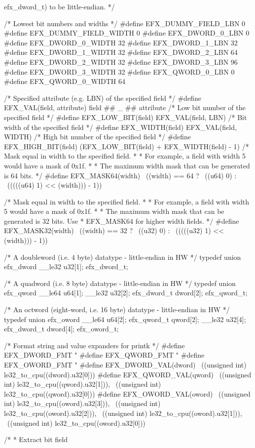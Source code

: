  efx_dword_t) to be little-endian.
 */

/* Lowest bit numbers and widths */
#define EFX_DUMMY_FIELD_LBN 0
#define EFX_DUMMY_FIELD_WIDTH 0
#define EFX_DWORD_0_LBN 0
#define EFX_DWORD_0_WIDTH 32
#define EFX_DWORD_1_LBN 32
#define EFX_DWORD_1_WIDTH 32
#define EFX_DWORD_2_LBN 64
#define EFX_DWORD_2_WIDTH 32
#define EFX_DWORD_3_LBN 96
#define EFX_DWORD_3_WIDTH 32
#define EFX_QWORD_0_LBN 0
#define EFX_QWORD_0_WIDTH 64

/* Specified attribute (e.g. LBN) of the specified field */
#define EFX_VAL(field, attribute) field ## _ ## attribute
/* Low bit number of the specified field */
#define EFX_LOW_BIT(field) EFX_VAL(field, LBN)
/* Bit width of the specified field */
#define EFX_WIDTH(field) EFX_VAL(field, WIDTH)
/* High bit number of the specified field */
#define EFX_HIGH_BIT(field) (EFX_LOW_BIT(field) + EFX_WIDTH(field) - 1)
/* Mask equal in width to the specified field.
 *
 * For example, a field with width 5 would have a mask of 0x1f.
 *
 * The maximum width mask that can be generated is 64 bits.
 */
#define EFX_MASK64(width)			\
	((width) == 64 ? ~((u64) 0) :		\
	 (((((u64) 1) << (width))) - 1))

/* Mask equal in width to the specified field.
 *
 * For example, a field with width 5 would have a mask of 0x1f.
 *
 * The maximum width mask that can be generated is 32 bits.  Use
 * EFX_MASK64 for higher width fields.
 */
#define EFX_MASK32(width)			\
	((width) == 32 ? ~((u32) 0) :		\
	 (((((u32) 1) << (width))) - 1))

/* A doubleword (i.e. 4 byte) datatype - little-endian in HW */
typedef union efx_dword {
	__le32 u32[1];
} efx_dword_t;

/* A quadword (i.e. 8 byte) datatype - little-endian in HW */
typedef union efx_qword {
	__le64 u64[1];
	__le32 u32[2];
	efx_dword_t dword[2];
} efx_qword_t;

/* An octword (eight-word, i.e. 16 byte) datatype - little-endian in HW */
typedef union efx_oword {
	__le64 u64[2];
	efx_qword_t qword[2];
	__le32 u32[4];
	efx_dword_t dword[4];
} efx_oword_t;

/* Format string and value expanders for printk */
#define EFX_DWORD_FMT "%
#define EFX_QWORD_FMT "%
#define EFX_OWORD_FMT "%
#define EFX_DWORD_VAL(dword)				\
	((unsigned int) le32_to_cpu((dword).u32[0]))
#define EFX_QWORD_VAL(qword)				\
	((unsigned int) le32_to_cpu((qword).u32[1])),	\
	((unsigned int) le32_to_cpu((qword).u32[0]))
#define EFX_OWORD_VAL(oword)				\
	((unsigned int) le32_to_cpu((oword).u32[3])),	\
	((unsigned int) le32_to_cpu((oword).u32[2])),	\
	((unsigned int) le32_to_cpu((oword).u32[1])),	\
	((unsigned int) le32_to_cpu((oword).u32[0]))

/*
 * Extract bit field
